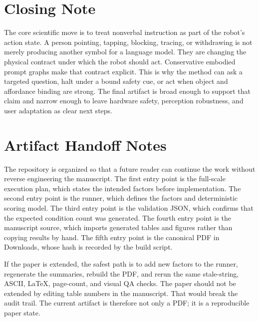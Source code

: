 \documentclass{article}
\begin{document}
\section{Closing Note}

The core scientific move is to treat nonverbal instruction as part of the robot's action state. A person pointing, tapping, blocking, tracing, or withdrawing is not merely producing another symbol for a language model. They are changing the physical contract under which the robot should act. Conservative embodied prompt graphs make that contract explicit. This is why the method can ask a targeted question, halt under a bound safety cue, or act when object and affordance binding are strong. The final artifact is broad enough to support that claim and narrow enough to leave hardware safety, perception robustness, and user adaptation as clear next steps.

\section{Artifact Handoff Notes}

The repository is organized so that a future reader can continue the work without reverse engineering the manuscript. The first entry point is the full-scale execution plan, which states the intended factors before implementation. The second entry point is the runner, which defines the factors and deterministic scoring model. The third entry point is the validation JSON, which confirms that the expected condition count was generated. The fourth entry point is the manuscript source, which imports generated tables and figures rather than copying results by hand. The fifth entry point is the canonical PDF in Downloads, whose hash is recorded by the build script.

If the paper is extended, the safest path is to add new factors to the runner, regenerate the summaries, rebuild the PDF, and rerun the same stale-string, ASCII, LaTeX, page-count, and visual QA checks. The paper should not be extended by editing table numbers in the manuscript. That would break the audit trail. The current artifact is therefore not only a PDF; it is a reproducible paper state.
\end{document}
